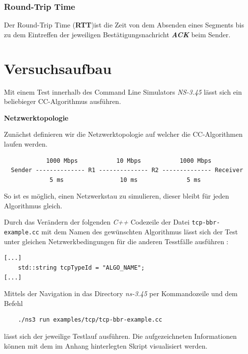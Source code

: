\documentclass[paper=a4,fontsize=12pt,ngerman]{scrartcl}
\begin{document}
\subsubsection{Round-Trip Time} \label{rtt-def}

Der Round-Trip Time (\textbf{RTT})ist die Zeit von dem Absenden eines Segments bis zu dem Eintreffen der jeweiligen Bestätigungsnachricht \textit{\textbf{ACK}} beim Sender.



\clearpage
\section{Versuchsaufbau}

Mit einem Test innerhalb des Command Line Simulators \textit{NS-3.45}\cite{ns3-simu} lässt sich ein beliebieger CC-Algorithmus ausführen.


\textbf{Netzwerktopologie}

Zunächst definieren wir die Netzwerktopologie auf welcher die CC-Algorithmen
laufen werden.\cite{ns3BBR}
\small
\begin{verbatim}
            1000 Mbps           10 Mbps           1000 Mbps
  Sender -------------- R1 -------------- R2 -------------- Receiver
             5 ms                10 ms              5 ms
\end{verbatim}
So ist es möglich, einen Netzwerkstau zu simulieren, dieser bleibt für jeden Algorithmus gleich.

Durch das Verändern der folgenden \textit{C++} Codezeile der Datei \verb|tcp-bbr-example.cc| mit dem Namen des gewünschten Algorithmus lässt sich der Test unter gleichen Netzwerkbedingungen für die anderen Tesstfälle ausführen :

\small
\begin{verbatim}
[...]
    std::string tcpTypeId = "ALGO_NAME";     
[...]
\end{verbatim}
Mittels der Navigation in das Directory \textit{ns-3.45} per Kommandozeile und dem Befehl
\small
\begin{verbatim}
    ./ns3 run examples/tcp/tcp-bbr-example.cc
\end{verbatim}
lässt sich der jeweilige Testlauf ausführen.
 Die aufgezeichneten Informationen können mit dem im Anhang hinterlegten Skript visualisiert werden.
\end{document}
